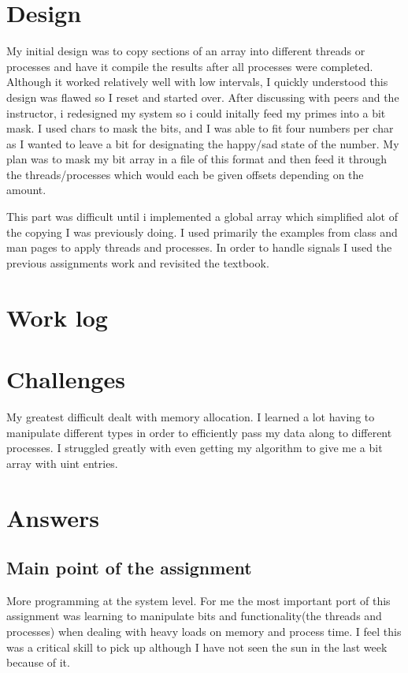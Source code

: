 \documentclass[letterpaper,10pt,titlepage]{article}
\begin{document}
\section{Design}
	My initial design was to copy sections of an array into different threads or processes and have it compile the results after all processes were
	completed. Although it worked relatively well with low intervals, I quickly understood this design was flawed so I reset and started over.
	After discussing with peers and the instructor, i redesigned my system so i could initally feed my primes into a bit mask. I used chars to mask the bits,
	and I was able to fit four numbers per char as I wanted to leave a bit for designating the happy/sad state of the number. 
	My plan was to mask my bit array in a file of this format and then feed it through the threads/processes which would each be given offsets depending on the amount.
	
	This part was difficult until i implemented a global array which simplified alot of the copying I was previously doing. 
	I used primarily the examples from class and man pages to apply threads and processes. In order to handle signals I used the previous assignments work and revisited 
	the textbook.
\section{Work log}


\section{Challenges}
My greatest difficult dealt with memory allocation. I learned a lot having to manipulate different types in order to efficiently pass my data
along to different processes. I struggled greatly with even getting my algorithm to give me a bit array with uint entries.


\section{Answers}
\subsection{Main point of the assignment}
More programming at the system level. For me the most important port of this assignment was learning to manipulate
bits and functionality(the threads and processes) when dealing with heavy loads on memory and process time. I feel this
was a critical skill to pick up although I have not seen the sun in the last week because of it.
\end{document}
